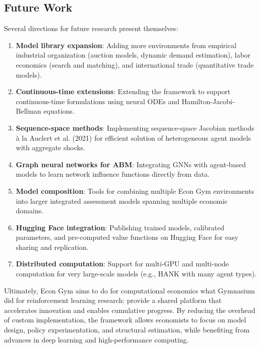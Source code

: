 \documentclass[12pt]{article}
\begin{document}
\subsection{Future Work}

Several directions for future research present themselves:

\begin{enumerate}
    \item \textbf{Model library expansion}: Adding more environments from empirical industrial organization (auction models, dynamic demand estimation), labor economics (search and matching), and international trade (quantitative trade models).
    
    \item \textbf{Continuous-time extensions}: Extending the framework to support continuous-time formulations using neural ODEs and Hamilton-Jacobi-Bellman equations.
    
    \item \textbf{Sequence-space methods}: Implementing sequence-space Jacobian methods \`{a} la Auclert et al. (2021) for efficient solution of heterogeneous agent models with aggregate shocks.
    
    \item \textbf{Graph neural networks for ABM}: Integrating GNNs with agent-based models to learn network influence functions directly from data.
    
    \item \textbf{Model composition}: Tools for combining multiple Econ Gym environments into larger integrated assessment models spanning multiple economic domains.
    
    \item \textbf{Hugging Face integration}: Publishing trained models, calibrated parameters, and pre-computed value functions on Hugging Face for easy sharing and replication.
    
    \item \textbf{Distributed computation}: Support for multi-GPU and multi-node computation for very large-scale models (e.g., HANK with many agent types).
\end{enumerate}

Ultimately, Econ Gym aims to do for computational economics what Gymnasium did for reinforcement learning research: provide a shared platform that accelerates innovation and enables cumulative progress. By reducing the overhead of custom implementation, the framework allows economists to focus on model design, policy experimentation, and structural estimation, while benefiting from advances in deep learning and high-performance computing.
\end{document}
